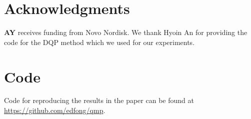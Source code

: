 \documentclass[11pt,a4paper]{article}
\begin{document}
\newpage
\section*{Acknowledgments}
\textbf{AY} receives funding from Novo Nordisk. We thank Hyoin An for providing the code for the DQP method which we used for our experiments. 
\vspace{-4mm}

\section*{Code}
Code for reproducing the results in the paper can be found at \url{https://github.com/edfong/qmp}. \vspace{-4mm}



\end{document}
